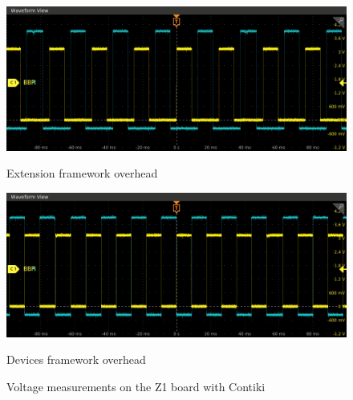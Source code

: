 \begin{figure}[!ht]
    \begin{minipage}{.45\textwidth}        
        \centering
        \includegraphics[scale=.25]{assets/extension-framework-overhead-contiki-z1.png}
        \caption{Extension framework overhead \label{fig:overhead-extension-contiki-z1}}
    \end{minipage}\hfill
    \begin{minipage}{.45\textwidth}
        \centering
        \includegraphics[scale=.25]{assets/devices-framework-overhead-contiki-z1.png}
        \caption{Devices framework overhead \label{fig:overhead-devices-contiki-z1}}
    \end{minipage}\hfill
    \caption*{Voltage measurements on the Z1 board with Contiki}
\end{figure}



